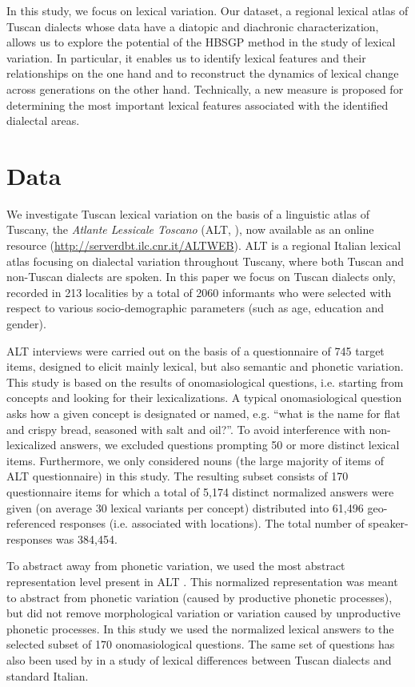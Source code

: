\documentclass[output=paper]{LSP/langsci}
\begin{document}
In this study, we focus on lexical variation. Our dataset, a regional lexical atlas of Tuscan dialects whose data have a diatopic and diachronic characterization, allows us to explore the potential of the HBSGP method in the study of lexical variation. In particular, it enables us to identify lexical features and their relationships on the one hand and to reconstruct the dynamics of lexical change across generations on the other hand. Technically, a new measure is proposed for determining the most important lexical features associated with the identified dialectal areas.

\section{Data}
We investigate Tuscan lexical variation on the basis of a linguistic atlas of Tuscany, the \textit{Atlante Lessicale Toscano} (ALT, \citealt{giacomelli_atlante_2000}), now available as an online resource (\url{http://serverdbt.ilc.cnr.it/ALTWEB}). ALT is a regional Italian lexical atlas focusing on dialectal variation throughout Tuscany, where both Tuscan and non-Tuscan dialects are spoken. In this paper we focus on Tuscan dialects only, recorded in 213 localities by a total of 2060 informants who were selected with respect to various socio-demographic parameters (such as age, education and gender). 

ALT interviews were carried out on the basis of a questionnaire of 745 target items, designed to elicit mainly lexical, but also semantic and phonetic variation. This study is based on the results of onomasiological questions, i.e. starting from concepts and looking for their lexicalizations. A typical onomasiological question asks how a given concept is designated or named, e.g. “what is the name for flat and crispy bread, seasoned with salt and oil?”. To avoid interference with non-lexicalized answers, we excluded questions prompting 50 or more distinct lexical items. Furthermore, we only considered nouns (the large majority of items of ALT questionnaire) in this study. The resulting subset consists of 170 questionnaire items for which a total of 5,174 distinct normalized answers were given (on average 30 lexical variants per concept) distributed into 61,496 geo-referenced responses (i.e. associated with locations). The total number of speaker-responses was 384,454. 

To abstract away from phonetic variation, we used the most abstract representation level present in ALT \citep{cucurullo_dialectal_2006}. This normalized representation was meant to abstract from phonetic variation (caused by productive phonetic processes), but did not remove morphological variation or variation caused by unproductive phonetic processes. In this study we used the normalized lexical answers to the selected subset of 170 onomasiological questions. The same set of questions has also been used by \citet{wieling_analyzing_2014} in a study of lexical differences between Tuscan dialects and standard Italian.
\end{document}
